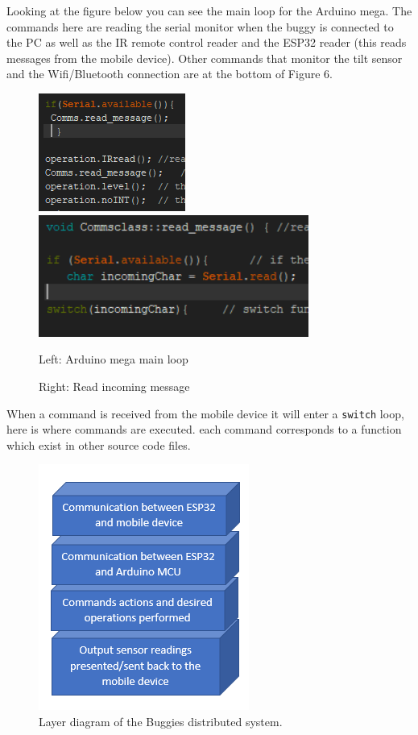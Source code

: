 \documentclass[8pt, a4paper]{article}
\begin{document}
Looking at the figure below you can see the main loop for the Arduino mega. The commands here are reading the serial monitor when the buggy is connected to the PC as well as the IR remote control reader and the ESP32 reader (this reads messages from the mobile device). Other commands that monitor the tilt sensor and the Wifi/Bluetooth connection are at the bottom of Figure 6. 

\begin{figure}[H]
\centering
\includegraphics[]{main_loop}
\includegraphics[height=4cm]{read_message}
\caption{Left: Arduino mega main loop}
\caption{Right: Read incoming message}
\end{figure}

When a command is received from the mobile device it will enter a \verb|switch| loop, here is where commands are executed. each command corresponds to a function which exist in other source code files.

\begin{figure}[H]
	\centering
	\includegraphics[]{layer}
	\caption{Layer diagram of the Buggies distributed system.}

\end{figure}
\end{document}
